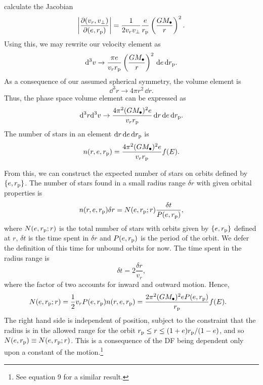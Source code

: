 calculate the Jacobian
\begin{equation}
\left|\dfrac{\partial(v_r, v_\perp)}{\partial(e, r_\mathrm{p})}\right| = \dfrac{1}{2v_rv_\perp}\dfrac{e}{r_\mathrm{p}}\left(\dfrac{GM_\bullet}{r}\right)^2.
\end{equation}
Using this, we may
rewrite our velocity element as
\begin{equation}
\mathrm{d}^3v \rightarrow \dfrac{\pi e}{v_r r_\mathrm{p}}\left(\dfrac{GM_\bullet}{r}\right)^2\,\mathrm{d} e \,\mathrm{d} r_\mathrm{p}.
\end{equation}
As a consequence of our assumed spherical symmetry, 
the volume element is
\begin{equation}
\dd^3r \rightarrow 4\pi r^2 \,\dd r.
\end{equation}
Thus, 
the phase space volume element can be expressed as
\begin{equation}
\mathrm{d}^3r\mathrm{d}^3v \rightarrow \dfrac{4\pi^2(GM_\bullet)^2e}{v_r r_\mathrm{p}}\,\mathrm{d} r\,\mathrm{d} e \,\mathrm{d} r_\mathrm{p}.
\end{equation}
The number of stars in an element $\mathrm{d} r\,\mathrm{d} e\,\mathrm{d} r_\mathrm{p}$ is
\begin{equation}
n(r, e, r_\mathrm{p}) = \dfrac{4\pi^2(GM_\bullet)^2e}{v_r r_\mathrm{p}}f(E).
\end{equation}

From this, we can construct the expected number of stars on orbits defined by $\{e, r_\mathrm{p}\}$. The number of stars found in a small radius range $\delta r$ with given orbital properties is
\begin{equation}
n(r, e, r_\mathrm{p})\delta r = N(e, r_\mathrm{p}; r)\dfrac{\delta t}{P(e, r_\mathrm{p})},
\end{equation}
where $N(e, r_\mathrm{p}; r)$ is the total number of stars with orbits given by $\{e, r_\mathrm{p}\}$ defined at $r$, $\delta t$ is the time spent in $\delta r$ and $P(e, r_\mathrm{p})$ is the period of the orbit. We defer the definition of this time for unbound orbits for now. The time spent in the radius range is
\begin{equation}
\delta t = 2\dfrac{\delta r}{v_r},
\end{equation}
where the factor of two accounts for inward and outward motion. Hence,
\begin{align}
N(e, r_\mathrm{p}; r) = {} & \dfrac{1}{2} v_r P(e, r_\mathrm{p}) n(r, e, r_\mathrm{p}) = \dfrac{2\pi^2(GM_\bullet)^2 e P(e, r_\mathrm{p})}{r_\mathrm{p}}f(E).
\end{align}
The right hand side is independent of position, subject to the constraint that the radius is in the allowed range for the orbit $r_\mathrm{p} \leq r \leq (1+e)r_\mathrm{p}/(1-e)$, and so $N(e, r_\mathrm{p}) \equiv N(e, r_\mathrm{p}; r)$. This is a consequence of the DF being dependent only upon a constant of the motion.\footnote{See \citet{Bahcall1976} equation 9 for a similar result.}


